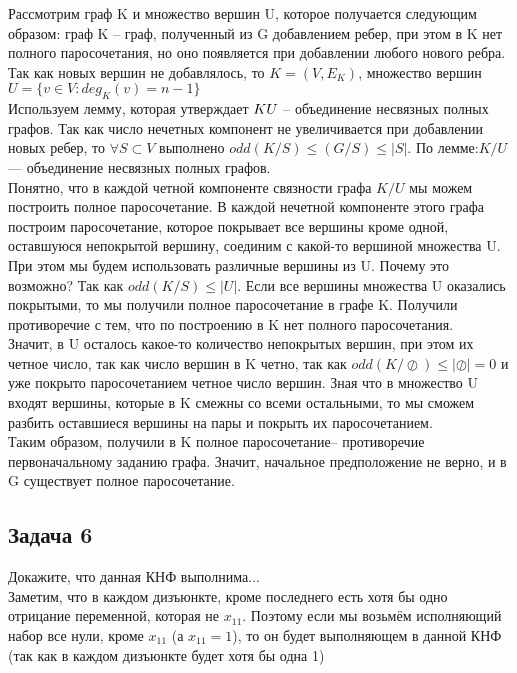 \documentclass[a4paper,12pt]{article} %
\begin{document}
Рассмотрим граф K и множество вершин U, которое получается следующим образом: граф K -- граф, полученный из G добавлением ребер, при этом в K нет полного паросочетания, но оно появляется при добавлении любого нового ребра. Так как новых вершин не добавлялось, то $ K = (V, E_K)$, множество вершин $U = \{v \in V: deg_K(v) = n -1\}$ \\
Используем лемму, которая утверждает $ K\\U $ -- объединение несвязных полных графов. Так как число нечетных компонент не увеличивается при добавлении новых ребер, то $ \forall S \subset V $ выполнено $ odd(K/S)\leqslant (G/S) \leqslant |S|$. По лемме:$ K/U $— объединение несвязных полных графов.\\
Понятно, что в каждой четной компоненте связности графа $ K/U $ мы можем построить полное паросочетание. В каждой нечетной компоненте этого графа построим паросочетание, которое покрывает все вершины кроме одной, оставшуюся непокрытой вершину, соединим с какой-то вершиной множества U. При этом мы будем использовать различные вершины из U. Почему это возможно? Так как $ odd(K/S)\leqslant |U| $. Если все вершины множества U оказались покрытыми, то мы получили полное паросочетание в графе K. Получили противоречие с тем, что по построению в K нет полного паросочетания.\\
Значит, в U осталось какое-то количество непокрытых вершин, при этом их четное число, так как число вершин в K четно, так как $ odd(K/\oslash)\leqslant |\oslash| = 0 $ и уже покрыто паросочетанием четное число вершин. Зная что в множество U входят вершины, которые в K смежны со всеми остальными, то мы сможем разбить оставшиеся вершины на пары и покрыть их паросочетанием.\\

Таким образом, получили в K полное паросочетание-- противоречие первоначальному заданию графа. Значит, начальное предположение не верно, и в G существует полное паросочетание.


\subsection*{Задача 6}
Докажите, что данная КНФ выполнима$ \ldots $\\
Заметим, что в каждом дизъюнкте, кроме последнего есть хотя бы одно отрицание переменной, которая не $ x_{11} $. Поэтому если мы возьмём исполняющий набор все нули, кроме $ x_{11} $ (а $ x_{11} = 1$), то он будет выполняющем в данной КНФ (так как в каждом дизъюнкте будет хотя бы одна 1)\\
\end{document}
